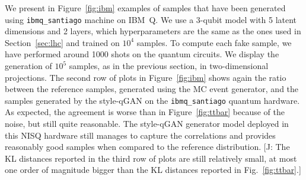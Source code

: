 \documentclass[twocolumn,preprintnumbers,superscriptaddress]{revtex4-2}
\newcommand{\commentJB}[1]{{\color{blue} {[J: #1]}}}
\begin{document}
We present in Figure~\ref{fig:ibm} examples of samples that have been
generated using {\tt ibmq\_santiago} machine on IBM~Q. We use a 3-qubit
model with 5 latent dimensions and 2 layers, which hyperparameters are
the same as the ones used in Section~\ref{sec:lhc} and trained on
$10^4_{}$ samples. To compute each fake sample, we have performed around 1000 shots on the
quantum circuits. We display the generation of $10^5_{}$ samples, as in the previous section,
in two-dimensional projections. The second row of plots in
Figure~\ref{fig:ibm} shows again the ratio between the reference
samples, generated using the MC event generator, and the samples
generated by the style-qGAN on the {\tt ibmq\_santiago} quantum
hardware. As expected, the agreement is worse than in
Figure~\ref{fig:ttbar} because of the noise, but still quite
reasonable. The
style-qGAN generator model deployed in this NISQ hardware still
manages to capture the correlations and provides reasonably good
samples when compared to the reference distribution.
\commentJB{The KL distances reported in the third row of plots are still relatively small, at most one
  order of magnitude bigger than the KL distances reported in Fig.~\ref{fig:ttbar}.}
\end{document}
